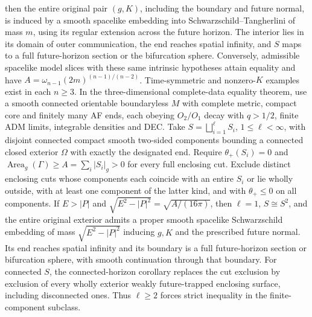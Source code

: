 \documentclass[11pt]{article}
\begin{document}
then the entire original pair $(g,K)$, including the boundary and future normal, is induced by a smooth spacelike embedding into Schwarzschild--Tangherlini of mass $m$, using its regular extension across the future horizon. The interior lies in its domain of outer communication, the end reaches spatial infinity, and $S$ maps to a full future-horizon section or the bifurcation sphere. Conversely, admissible spacelike model slices with these same intrinsic hypotheses attain equality and have $A=\omega_{n-1}(2m)^{(n-1)/(n-2)}$. Time-symmetric and nonzero-$K$ examples exist in each $n\ge3$. In the three-dimensional complete-data equality theorem, use a smooth connected orientable boundaryless $M$ with complete metric, compact core and finitely many AF ends, each obeying $O_2/O_1$ decay with $q>1/2$, finite ADM limits, integrable densities and DEC. Take $S=\bigsqcup_{i=1}^{\ell}S_i$, $1\le\ell<\infty$, with disjoint connected compact smooth two-sided components bounding a connected closed exterior $\Omega$ with exactly the designated end. Require $\theta_+(S_i)=0$ and $\operatorname{Area}_g(\Gamma)\ge A=\sum_i|S_i|_g>0$ for every full enclosing cut. Exclude distinct enclosing cuts whose components each coincide with an entire $S_i$ or lie wholly outside, with at least one component of the latter kind, and with $\theta_+\le0$ on all components. If $E>|P|$ and $\sqrt{E^2-|P|^2}=\sqrt{A/(16\pi)}$, then $\ell=1$, $S\cong S^2$, and the entire original exterior admits a proper smooth spacelike Schwarzschild embedding of mass $\sqrt{E^2-|P|^2}$ inducing $g,K$ and the prescribed future normal. Its end reaches spatial infinity and its boundary is a full future-horizon section or bifurcation sphere, with smooth continuation through that boundary. For connected $S$, the connected-horizon corollary replaces the cut exclusion by exclusion of every wholly exterior weakly future-trapped enclosing surface, including disconnected ones. Thus $\ell\ge2$ forces strict inequality in the finite-component subclass.
\end{document}
